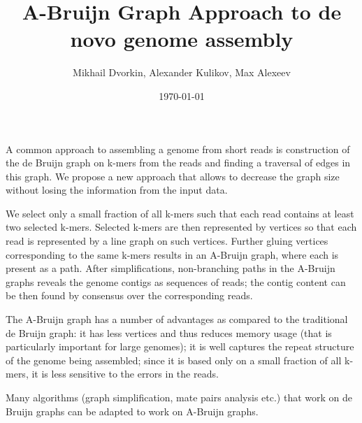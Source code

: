 \documentclass[12pt]{article}
\begin{document}
\author{Mikhail Dvorkin, Alexander Kulikov, Max Alexeev}
\title{A-Bruijn Graph Approach to de novo genome assembly}
\date{\today}
\maketitle

A common approach to assembling a genome from short reads is construction of the de Bruijn graph on k-mers from the reads and finding a traversal of edges in this graph. We propose a new approach that allows to decrease the graph size without losing the information from the input data.

We select only a small fraction of all k-mers such that each read contains at least two selected k-mers. Selected k-mers are then represented by vertices so that each read is represented by a line graph on such vertices. Further gluing vertices corresponding to the same k-mers results in an A-Bruijn graph, where each is present as a path. After simplifications, non-branching paths in the A-Bruijn graphs reveals the genome contigs as sequences of reads; the contig content can be then found by consensus over the corresponding reads.

The A-Bruijn graph has a number of advantages as compared to the traditional de Bruijn graph: it has less vertices and thus reduces memory usage (that is particularly important for large genomes); it is well captures the repeat structure of the genome being assembled; since it is based only on a small fraction of all k-mers, it is less sensitive to the errors in the reads.

Many algorithms (graph simplification, mate pairs analysis etc.) that work on de Bruijn graphs can be adapted to work on A-Bruijn graphs.
\end{document}
